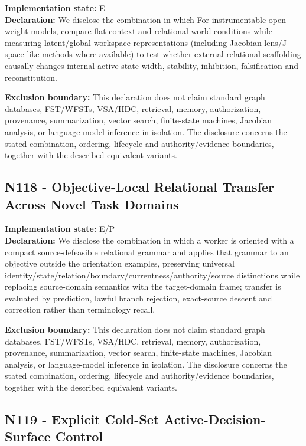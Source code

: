 \documentclass[
  10pt,
  letterpaper,
]{article}
\begin{document}
\textbf{Implementation state:} E\\
\textbf{Declaration:} We disclose the combination in which For
instrumentable open-weight models, compare flat-context and
relational-world conditions while measuring latent/global-workspace
representations (including Jacobian-lens/J-space-like methods where
available) to test whether external relational scaffolding causally
changes internal active-state width, stability, inhibition,
falsification and reconstitution.

\textbf{Exclusion boundary:} This declaration does not claim standard
graph databases, FST/WFSTs, VSA/HDC, retrieval, memory, authorization,
provenance, summarization, vector search, finite-state machines,
Jacobian analysis, or language-model inference in isolation. The
disclosure concerns the stated combination, ordering, lifecycle and
authority/evidence boundaries, together with the described equivalent
variants.

\subsection{N118 - Objective-Local Relational Transfer Across Novel Task
Domains}\label{n118---objective-local-relational-transfer-across-novel-task-domains}

\textbf{Implementation state:} E/P\\
\textbf{Declaration:} We disclose the combination in which a worker is
oriented with a compact source-defeasible relational grammar and applies
that grammar to an objective outside the orientation examples,
preserving universal
identity/state/relation/boundary/currentness/authority/source
distinctions while replacing source-domain semantics with the
target-domain frame; transfer is evaluated by prediction, lawful branch
rejection, exact-source descent and correction rather than terminology
recall.

\textbf{Exclusion boundary:} This declaration does not claim standard
graph databases, FST/WFSTs, VSA/HDC, retrieval, memory, authorization,
provenance, summarization, vector search, finite-state machines,
Jacobian analysis, or language-model inference in isolation. The
disclosure concerns the stated combination, ordering, lifecycle and
authority/evidence boundaries, together with the described equivalent
variants.

\subsection{N119 - Explicit Cold-Set Active-Decision-Surface
Control}\label{n119---explicit-cold-set-active-decision-surface-control}
\end{document}

